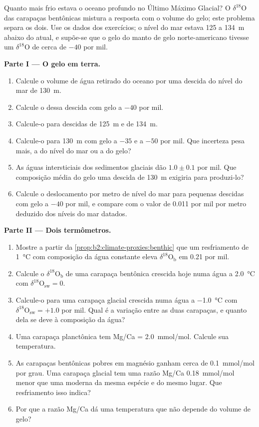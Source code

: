 \begin{problem}\label{pb:b2:climate-proxies:1}
Quanto mais frio estava o oceano profundo no Último Máximo Glacial? O $\delta^{18}$O das carapaças bentônicas
mistura a resposta com o volume do gelo; este problema separa os dois. Use os dados dos
exercícios; o nível do mar estava 125 a \qty{134}{m} abaixo do atual, e supõe-se que o gelo do manto de gelo
norte-americano tivesse um $\delta^{18}$O de cerca de $-40$ por mil.

\medskip\noindent\textbf{Parte I --- O gelo em terra.}
\begin{enumerate}
  \item Calcule o volume de água retirado do oceano por uma descida do nível do mar de \qty{130}{m}.
  \item Calcule o  dessa descida com gelo a $-40$ por mil.
  \item Calcule-o para descidas de \qty{125}{m} e de \qty{134}{m}.
  \item Calcule-o para \qty{130}{m} com gelo a $-35$ e a $-50$ por mil. Que incerteza
        pesa mais, a do nível do mar ou a do gelo?
  \item As águas intersticiais dos sedimentos glaciais dão $1.0 \pm 0.1$ por mil. Que composição média
        do gelo uma descida de \qty{130}{m} exigiria para produzi-lo?
  \item Calcule o deslocamento por metro de nível do mar para pequenas descidas com gelo a $-40$ por mil, e
        compare com o valor de \num{0.011} por mil por metro deduzido dos níveis do mar datados.
\end{enumerate}

\medskip\noindent\textbf{Parte II --- Dois termômetros.}
\begin{enumerate}[resume]
  \item Mostre a partir da \cref{prop:b2:climate-proxies:benthic} que um resfriamento de \qty{1}{\celsius} com
        composição da água constante eleva $\delta^{18}\mathrm{O}_{\mathrm{b}}$ em \num{0.21} por mil.
  \item Calcule o $\delta^{18}\mathrm{O}_{\mathrm{b}}$ de uma carapaça bentônica crescida hoje numa água a
        \qty{2.0}{\celsius} com $\delta^{18}\mathrm{O}_{\mathrm{sw}} = 0$.
  \item Calcule-o para uma carapaça glacial crescida numa água a \qty{-1.0}{\celsius} com
        $\delta^{18}\mathrm{O}_{\mathrm{sw}} = +1.0$ por mil. Qual é a variação entre as duas
        carapaças, e quanto dela se deve à composição da água?
  \item Uma carapaça planctônica tem Mg/Ca = \qty{2.0}{mmol/mol}. Calcule sua temperatura.
  \item As carapaças bentônicas pobres em magnésio ganham cerca de \qty{0.1}{mmol/mol} por grau. Uma carapaça glacial tem
        uma razão Mg/Ca \qty{0.18}{mmol/mol} menor que uma moderna da mesma espécie e do mesmo
        lugar. Que resfriamento isso indica?
  \item Por que a razão Mg/Ca dá uma temperatura que não depende do volume de gelo?
\end{enumerate}


\end{problem}
